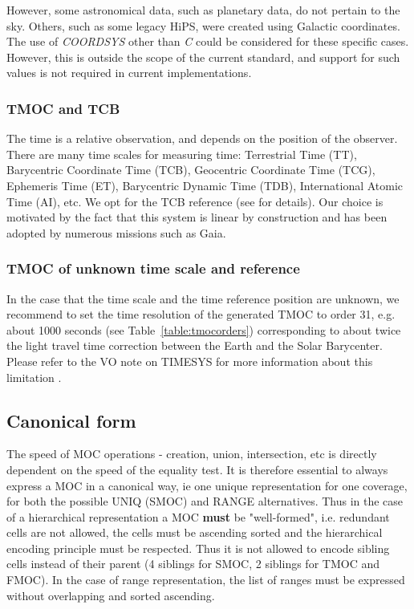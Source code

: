 \documentclass[11pt,a4paper]{ivoa}
\begin{document}
However, some astronomical data, such as planetary data, do not pertain to the sky.
Others, such as some legacy HiPS, were created using Galactic coordinates.
The use of \emph{COORDSYS} other than \emph{C} could be considered for these specific cases.
However, this is outside the scope of the current standard, and support for such values
is not required in current implementations.


\subsubsection{TMOC and TCB \label{sec:tcb}}

The time is a relative observation, and depends on the position of the
observer. There are many time scales for measuring time:
Terrestrial Time (TT), Barycentric Coordinate Time (TCB), Geocentric
Coordinate Time (TCG), Ephemeris Time (ET), Barycentric Dynamic Time
(TDB), International Atomic Time (AI), etc. We opt for the TCB
reference (see \cite{2015A&A...574A..36R} for details). Our
choice is motivated by the fact that this system is linear by
construction and has been adopted by numerous missions such as Gaia.

\subsubsection{TMOC of unknown time scale and reference}

In the case that the time scale and the time reference position are unknown,
we recommend to set the time resolution of the generated TMOC to order
31, e.g. about 1000 seconds (see Table~\ref{table:tmocorders}) corresponding
to about twice the light travel time correction between the Earth and
the Solar Barycenter. Please refer to the VO note on TIMESYS for more
information about this limitation \citep{timesysnote}.


\subsection{Canonical form}
\label{sec:can}
The speed of MOC operations - creation, union, intersection, etc
is directly dependent on the speed of the equality test. It is
therefore essential to always express a MOC in a canonical way, ie
one unique representation for one coverage, for both the possible UNIQ (SMOC) and RANGE alternatives.
Thus in the case of a hierarchical representation a MOC \textbf{must} be "well-formed", i.e. 
redundant cells are not allowed, the cells must be ascending sorted
and the hierarchical encoding principle must be respected. Thus it
is not allowed to encode sibling cells instead of their parent (4
siblings for SMOC, 2 siblings for TMOC and FMOC). In the case of range
representation, the list of ranges must be expressed without
overlapping and sorted ascending.
\end{document}
